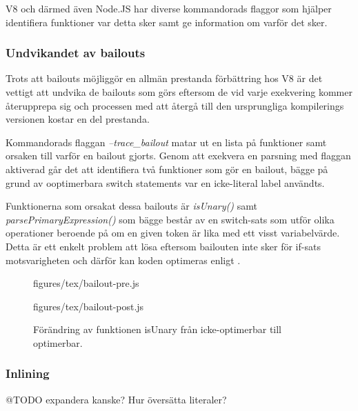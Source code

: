 V8 och därmed även Node.JS har diverse kommandorads flaggor som hjälper
identifiera funktioner var detta sker samt ge information om varför det sker.

\subsubsection{Undvikandet av bailouts}

Trots att bailouts möjliggör en allmän prestanda förbättring hos V8 är det
vettigt att undvika de bailouts som görs eftersom de vid varje exekvering
kommer återupprepa sig och processen med att återgå till den ursprungliga
kompilerings versionen kostar en del prestanda.

Kommandorads flaggan \textit{--trace_bailout} matar ut en lista på funktioner
samt orsaken till varför en bailout gjorts. Genom att exekvera en parsning med
flaggan aktiverad går det att identifiera två funktioner som gör en bailout,
bägge på grund av ooptimerbara switch statements var en icke-literal label
användts.

Funktionerna som orsakat dessa bailouts är \textit{isUnary()} samt
\textit{parsePrimaryExpression()} som bägge består av en switch-sats som utför
olika operationer beroende på om en given token är lika med ett visst
variabelvärde.  Detta är ett enkelt problem att lösa eftersom bailouten inte
sker för if-sats motsvarigheten och därför kan koden optimeras enligt
.

\begin{figure}[ht]
  \begin{minipage}[t]{0.5\textwidth}
      {figures/tex/bailout-pre.js}
  \end{minipage}%
  \begin{minipage}[t]{0.5\textwidth}
      {figures/tex/bailout-post.js}
  \end{minipage}
  \caption{Förändring av funktionen isUnary från icke-optimerbar till
  optimerbar.}
  \label{fig:bailout}
\end{figure}

\subsubsection{Inlining}

@TODO expandera kanske? Hur översätta literaler?

